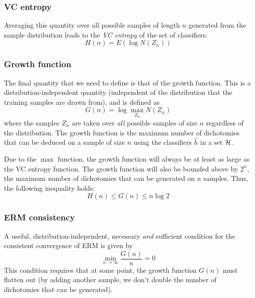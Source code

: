 \subsubsection{VC entropy}

Averaging this quantity over all possible samples of length $n$
generated from the sample distribution leads to the \emph{VC entropy}
of the set of classifiers:
%
\begin{equation}
H(n) = E(\log N(Z_n))
\end{equation}

\subsubsection{Growth function}

The final quantity that we need to define is that of the growth
function.  This is a distribution-independent quantity (independent of
the distribution that the training samples are drawn from), and is
defined as
%
\begin{equation}
G(n) = \log \max_{Z_n} N(Z_n)
\end{equation}
%
where the samples $Z_n$ are taken over \emph{all} possible samples of
size $n$ regardless of the distribution.  The growth function is the
maximum number of dichotomies that can be deduced on a sample of size
$n$ using the classifiers $\hat{h}$ in a set $\mathcal{H}$.

Due to the $\max$ function, the growth function will always be at
least as large as the VC entropy function.  The growth function will
also be bounded above by $2^n$, the maximum number of dichotomies that
can be generated on $n$ samples.  Thus, the following inequality holds:
%
\begin{equation}
H(n) \leq G(n) \leq n \log 2
\end{equation}

\subsubsection{ERM consistency}

A useful, distribution-independent, necessary \emph{and} sufficient
condition for the consistent convergence of ERM is
given by
%
\begin{equation}
\min_{n \rightarrow \infty} \frac{G(n)}{n} = 0
\label{eqn:growth function ERM consistency}
\end{equation}
%
This condition requires that at some point, the growth function $G(n)$
must flatten out (by adding another sample, we don't double the number
of dichotomies that can be generated).


